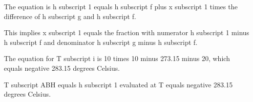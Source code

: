 The equation is h subscript 1 equals h subscript f plus x subscript 1 times the difference of h subscript g and h subscript f.

This implies x subscript 1 equals the fraction with numerator h subscript 1 minus h subscript f and denominator h subscript g minus h subscript f.

The equation for T subscript i is 10 times 10 minus 273.15 minus 20, which equals negative 283.15 degrees Celsius.

T subscript ABH equals h subscript 1 evaluated at T equals negative 283.15 degrees Celsius.